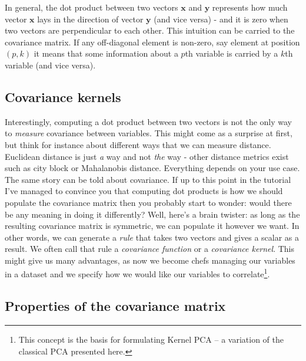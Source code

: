 \documentclass[10pt,twocolumn]{article}
\begin{document}
In general, the dot product between two vectors $\mathbf{x}$ and $\mathbf{y}$ represents how much vector $\mathbf{x}$ lays in the direction of vector $\mathbf{y}$ (and vice versa) - and it is zero when two vectors are perpendicular to each other. This intuition can be carried to the covariance matrix. If any off-diagonal element is non-zero, say element at position $(p,k)$ it means that some information about a $p$th variable is carried by a $k$th variable (and vice versa).

\subsection{Covariance kernels}

Interestingly, computing a dot product between two vectors is not the only way to \textit{measure} covariance between variables. This might come as a surprise at first, but think for instance about different ways that we can measure distance. Euclidean distance is just \textit{a} way and not \textit{the} way - other distance metrics exist such as city block or Mahalanobis distance. Everything depends on your use case. The same story can be told about covariance. If up to this point in the tutorial I've managed to convince you that computing dot products is how we should populate the covariance matrix then you probably start to wonder: would there be any meaning in doing it differently? Well, here's a brain twister: as long as the resulting covariance matrix is symmetric, we can populate it however we want. In other words, we can generate a \textit{rule} that takes two vectors and gives a scalar as a result. We often call that rule a \textit{covariance function} or a \textit{covariance kernel}. This might give us many advantages, as now we become chefs managing our variables in a dataset and we specify how we would like our variables to correlate\footnote{This concept is the basis for formulating Kernel PCA -- a variation of the classical PCA presented here.}.


\subsection{Properties of the covariance matrix} \label{sec:covariance-properties}
\end{document}

